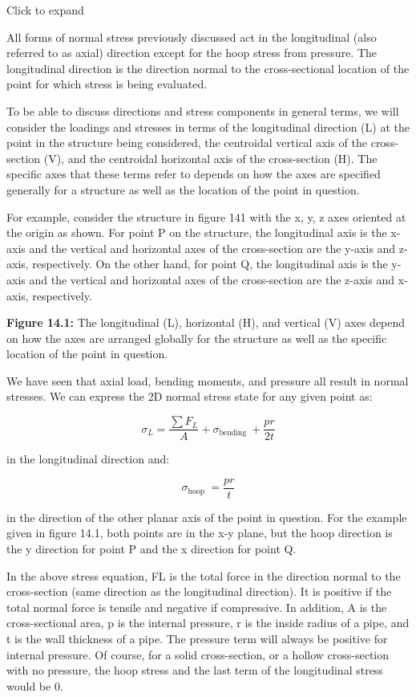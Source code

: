 \documentclass[
  letterpaper,
  DIV=11,
  numbers=noendperiod]{scrreprt}
\begin{document}
Click to expand

All forms of normal stress previously discussed act in the longitudinal
(also referred to as axial) direction except for the hoop stress from
pressure. The longitudinal direction is the direction normal to the
cross-sectional location of the point for which stress is being
evaluated.

To be able to discuss directions and stress components in general terms,
we will consider the loadings and stresses in terms of the longitudinal
direction (L) at the point in the structure being considered, the
centroidal vertical axis of the cross-section (V), and the centroidal
horizontal axis of the cross-section (H). The specific axes that these
terms refer to depends on how the axes are specified generally for a
structure as well as the location of the point in question.

For example, consider the structure in figure 141 with the x, y, z axes
oriented at the origin as shown. For point P on the structure, the
longitudinal axis is the x-axis and the vertical and horizontal axes of
the cross-section are the y-axis and z-axis, respectively. On the other
hand, for point Q, the longitudinal axis is the y-axis and the vertical
and horizontal axes of the cross-section are the z-axis and x-axis,
respectively.

\textbf{Figure 14.1:} The longitudinal (L), horizontal (H), and vertical
(V) axes depend on how the axes are arranged globally for the structure
as well as the specific location of the point in question.

We have seen that axial load, bending moments, and pressure all result
in normal stresses. We can express the 2D normal stress state for any
given point as:

\[
\sigma_L=\frac{\sum F_L}{A}+\sigma_{\text {bending }}+\frac{p r}{2 t}
\]

in the longitudinal direction and:

\[
\sigma_{\text {hoop }}=\frac{p r}{t}
\]

in the direction of the other planar axis of the point in question. For
the example given in figure 14.1, both points are in the x-y plane, but
the hoop direction is the y direction for point P and the x direction
for point Q.

In the above stress equation, FL is the total force in the direction
normal to the cross-section (same direction as the longitudinal
direction). It is positive if the total normal force is tensile and
negative if compressive. In addition, A is the cross-sectional area, p
is the internal pressure, r is the inside radius of a pipe, and t is the
wall thickness of a pipe. The pressure term will always be positive for
internal pressure. Of course, for a solid cross-section, or a hollow
cross-section with no pressure, the hoop stress and the last term of the
longitudinal stress would be 0.
\end{document}
